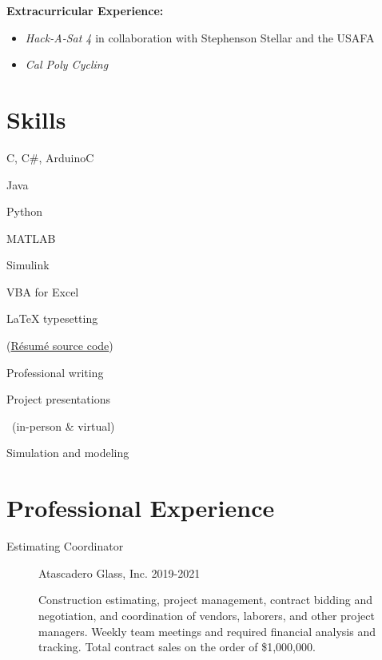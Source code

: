 \documentclass{article}[11pt]
\begin{document}
\begin{description}
\begin{itemize}
\end{itemize}

\textbf{Extracurricular Experience:}

\begin{itemize}
\item \textit{Hack-A-Sat 4} {\small in collaboration with Stephenson Stellar and the USAFA}

\item \textit{Cal Poly Cycling}

\end{itemize}

\end{description}

\section*{Skills}

\begin{minipage}{3.25cm}
C, C\#, ArduinoC

Java

Python
\end{minipage}\hfill\begin{minipage}{3cm}
MATLAB

Simulink

VBA for Excel
\end{minipage}\hfill\begin{minipage}{4.75cm}
\LaTeX{} typesetting 

(\href{https://github.com/ssharp120/LaTeXPDFs/blob/main/customResumeTemplate.tex}{R\'esum\'e source code})\footnotemark

Professional writing
\end{minipage}\hfill\begin{minipage}{5cm}
Project presentations

\ (in-person \& virtual)

Simulation and modeling
\end{minipage}

\section*{Professional Experience}

\begin{description}
\item[Estimating Coordinator] {\small Atascadero Glass, Inc.} \hfill 2019-2021

Construction estimating, project management, contract bidding and negotiation, and coordination of vendors, laborers, and other project managers. Weekly team meetings and required financial analysis and tracking. Total contract sales on the order of \$1,000,000.
\end{description}
\end{document}

